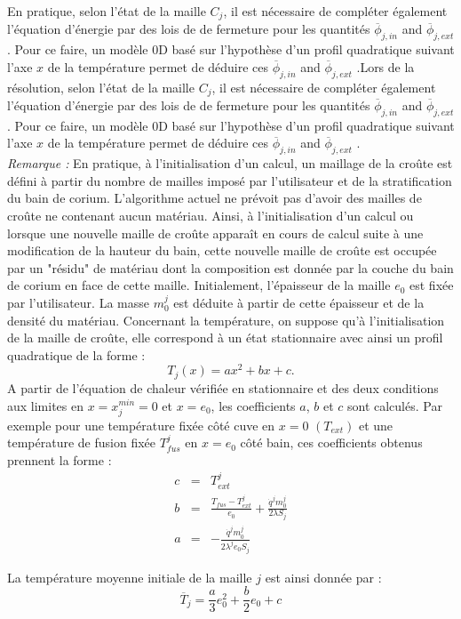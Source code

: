 En pratique, selon l'état de la maille $C_j$, il est nécessaire de compléter également l'équation d'énergie par des lois de de fermeture pour les quantités $\overline{\phi}_{j,in}$ and $\overline{\phi}_{j,ext}$. Pour ce faire, un modèle 0D basé sur l'hypothèse d'un profil quadratique suivant l'axe $x$ de la température permet de déduire ces $\overline{\phi}_{j,in}$ and $\overline{\phi}_{j,ext}$ \cite{LeTellier2016}.Lors de la résolution, selon l'état de la maille $C_j$, il est nécessaire de compléter également l'équation d'énergie par des lois de de fermeture pour les quantités $\overline{\phi}_{j,in}$ and $\overline{\phi}_{j,ext}$. Pour ce faire, un modèle 0D basé sur l'hypothèse d'un profil quadratique suivant l'axe $x$ de la température permet de déduire ces $\overline{\phi}_{j,in}$ and $\overline{\phi}_{j,ext}$ \cite{LeTellier2016}.\\

{\it Remarque :}
En pratique, à l'initialisation d'un calcul, un maillage de la croûte est défini à partir du nombre de mailles imposé par l'utilisateur et de la stratification du bain de corium. L'algorithme actuel ne prévoit pas d'avoir des mailles de croûte ne contenant aucun matériau. Ainsi, à l'initialisation d'un calcul ou lorsque une nouvelle maille de croûte apparaît en cours de calcul suite à une modification de la hauteur du bain, cette nouvelle maille de croûte est occupée par un "résidu" de matériau dont la composition est donnée par la couche du bain de corium en face de cette maille. Initialement, l'épaisseur de la maille $e_0$ est fixée par l'utilisateur. La masse $m_0^j$ est déduite à partir de cette épaisseur et de la densité du matériau. Concernant la température, on suppose qu'à l'initialisation de la maille de croûte, elle correspond à un état stationnaire avec ainsi un profil quadratique de la forme : 
$$T_j(x)=ax^2+bx+c.$$
A partir de l'équation de chaleur vérifiée en stationnaire et des deux conditions aux limites en $x=x_j^{min}=0$ et $x=e_0$, les coefficients $a$, $b$ et $c$ sont calculés. Par exemple pour une température fixée côté cuve en $x=0$ $(T_{ext})$ et une température de fusion fixée $T_{fus}^j$ en $x=e_0$ côté bain, ces coefficients obtenus prennent la forme :
\begin{eqnarray}
c &=& T_{ext}^j \\
b &=& \frac{T_{fus}-T_{ext}^j}{e_0}+\frac{\dot{q}^j m_0^j}{2\lambda S_j} \\
a &=& -\frac{\dot{q}^j m_0^j}{2\lambda^j e_0 S_j}
\end{eqnarray}

La température moyenne initiale de la maille $j$ est ainsi donnée par :
$$\overline{T}_{j}=\frac{a}{3} e_0^2 + \frac{b}{2} e_0 + c$$
